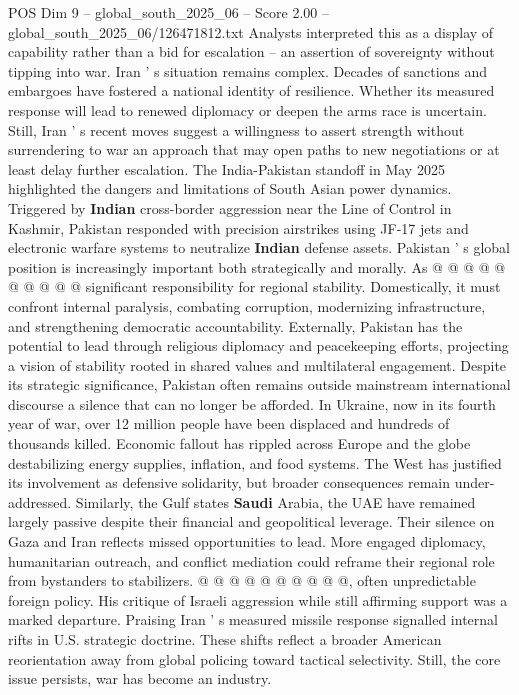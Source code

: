 \begin{textsample}{POS Dim 9 – global\_south\_2025\_06 – Score 2.00 – global\_south\_2025\_06/126471812.txt}
Analysts interpreted this as a display of capability rather than a bid for escalation -- an assertion of sovereignty without tipping into war.
Iran ' s situation remains complex.
Decades of sanctions and embargoes have fostered a national identity of resilience.
Whether its measured response will lead to renewed diplomacy or deepen the arms race is uncertain.
Still, Iran ' s recent moves suggest a willingness to assert strength without surrendering to war an approach that may open paths to new negotiations or at least delay further escalation.
The India-Pakistan standoff in May 2025 highlighted the dangers and limitations of South Asian power dynamics.
Triggered by \textbf{Indian} cross-border aggression near the Line of Control in Kashmir, Pakistan responded with precision airstrikes using JF-17 jets and electronic warfare systems to neutralize \textbf{Indian} defense assets.
Pakistan ' s global position is increasingly important both strategically and morally.
As @ @ @ @ @ @ @ @ @ @ significant responsibility for regional stability.
Domestically, it must confront internal paralysis, combating corruption, modernizing infrastructure, and strengthening democratic accountability.
Externally, Pakistan has the potential to lead through religious diplomacy and peacekeeping efforts, projecting a vision of stability rooted in shared values and multilateral engagement.
Despite its strategic significance, Pakistan often remains outside mainstream international discourse a silence that can no longer be afforded.
In Ukraine, now in its fourth year of war, over 12 million people have been displaced and hundreds of thousands killed.
Economic fallout has rippled across Europe and the globe destabilizing energy supplies, inflation, and food systems.
The West has justified its involvement as defensive solidarity, but broader consequences remain under-addressed.
Similarly, the Gulf states \textbf{Saudi} Arabia, the UAE have remained largely passive despite their financial and geopolitical leverage.
Their silence on Gaza and Iran reflects missed opportunities to lead.
More engaged diplomacy, humanitarian outreach, and conflict mediation could reframe their regional role from bystanders to stabilizers. @ @ @ @ @ @ @ @ @ @, often unpredictable foreign policy.
His critique of Israeli aggression while still affirming support was a marked departure.
Praising Iran ' s measured missile response signalled internal rifts in U.S. strategic doctrine.
These shifts reflect a broader American reorientation away from global policing toward tactical selectivity.
Still, the core issue persists, war has become an industry.

\end{textsample}
